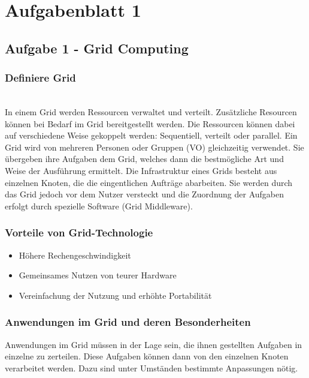 \section{Aufgabenblatt 1}

\subsection{Aufgabe 1 - Grid Computing}

\subsubsection{Definiere Grid}
\\

	In einem Grid werden Ressourcen verwaltet und verteilt.
	Zus\"atzliche Resourcen k\"onnen bei Bedarf im Grid bereitgestellt werden.
	Die Ressourcen k\"onnen dabei auf verschiedene Weise gekoppelt werden:
	Sequentiell, verteilt oder parallel.
	Ein Grid wird von mehreren Personen oder Gruppen (VO) gleichzeitig verwendet.
	Sie \"ubergeben ihre Aufgaben dem Grid, welches dann die bestm\"ogliche Art und Weise der Ausf\"uhrung ermittelt.
	Die Infrastruktur eines Grids besteht aus einzelnen Knoten,
	die die eingentlichen Auftr\"age abarbeiten.
	Sie werden durch das Grid jedoch vor dem Nutzer versteckt und die Zuordnung der
	Aufgaben erfolgt durch spezielle Software (Grid Middleware).
	
\subsubsection{Vorteile von Grid-Technologie}
	\begin{itemize}
		\item H\"ohere Rechengeschwindigkeit	
		\item Gemeinsames Nutzen von teurer Hardware
		\item Vereinfachung der Nutzung und erh\"ohte Portabilit\"at
	\end{itemize}
	
\subsubsection{Anwendungen im Grid und deren Besonderheiten}
	Anwendungen im Grid m\"ussen in der Lage sein,
	die ihnen gestellten Aufgaben in einzelne zu zerteilen.
	Diese Aufgaben k\"onnen dann von den einzelnen Knoten verarbeitet werden.
	Dazu sind unter Umst\"anden bestimmte Anpassungen n\"otig.
	
